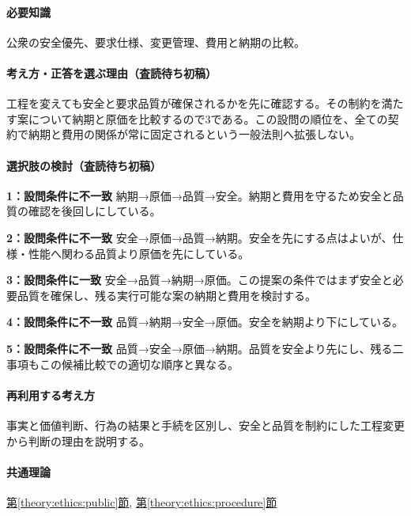 \paragraph{必要知識} 公衆の安全優先、要求仕様、変更管理、費用と納期の比較。

\paragraph{考え方・正答を選ぶ理由（査読待ち初稿）} 工程を変えても安全と要求品質が確保されるかを先に確認する。その制約を満たす案について納期と原価を比較するので3である。この設問の順位を、全ての契約で納期と費用の関係が常に固定されるという一般法則へ拡張しない。

\paragraph{選択肢の検討（査読待ち初稿）}\mbox{}\par

\noindent\textbf{1：設問条件に不一致} 納期→原価→品質→安全。納期と費用を守るため安全と品質の確認を後回しにしている。\par

\noindent\textbf{2：設問条件に不一致} 安全→原価→品質→納期。安全を先にする点はよいが、仕様・性能へ関わる品質より原価を先にしている。\par

\noindent\textbf{3：設問条件に一致} 安全→品質→納期→原価。この提案の条件ではまず安全と必要品質を確保し、残る実行可能な案の納期と費用を検討する。\par

\noindent\textbf{4：設問条件に不一致} 品質→納期→安全→原価。安全を納期より下にしている。\par

\noindent\textbf{5：設問条件に不一致} 品質→安全→原価→納期。品質を安全より先にし、残る二事項もこの候補比較での適切な順序と異なる。\par

\paragraph{再利用する考え方} 事実と価値判断、行為の結果と手続を区別し、安全と品質を制約にした工程変更から判断の理由を説明する。

\paragraph{共通理論} \hyperref[theory:ethics:public]{第\ref*{theory:ethics:public}節}, \hyperref[theory:ethics:procedure]{第\ref*{theory:ethics:procedure}節}

